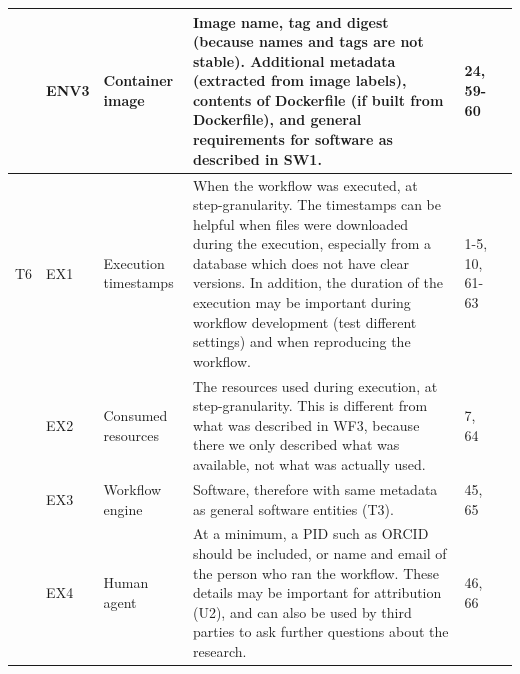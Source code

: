\begin{table}
\begin{tabularx}{\linewidth}{p{0.1in}p{0.3in}p{1.3in}Lp{0.45in}p{0.3in}}
    & ENV3  & Container image                   & Image name, tag and digest (because names and tags are not stable). Additional metadata (extracted from image labels), contents of Dockerfile (if built from Dockerfile), and general requirements for software as described in SW1.                & 24, 59-60 &  \\
\midrule
T6  & EX1   & Execution timestamps              & When the workflow was executed, at step-granularity. The timestamps can be helpful when files were downloaded during the execution, especially from a database which does not have clear versions. In addition, the duration of the execution may be important during workflow development (test different settings) and when reproducing the workflow. & 1-5, 10, 61-63 &   \\
    & EX2   & Consumed resources             & The resources used during execution, at step-granularity. This is different from what was described in WF3, because there we only described what was available, not what was actually used.  & 7, 64  &  \\
    & EX3   & Workflow engine                   & Software, therefore with same metadata as general software entities (T3).             & 45, 65 & \\
    & EX4   & Human agent                       & At a minimum, a PID such as ORCID should be included, or name and email of the person who ran the workflow. These details may be important for attribution (U2), and can also be used by third parties to ask further questions about the research.                 & 46, 66 &  \\
\bottomrule
\end{tabularx}


\end{table}
